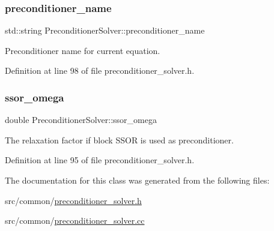 \mbox{\label{class_preconditioner_solver_a2d8afd11d073e87487da0442486c3e48}} 
\subsubsection{\texorpdfstring{preconditioner\+\_\+name}{preconditioner\_name}}
{\footnotesize\ttfamily std\+::string Preconditioner\+Solver\+::preconditioner\+\_\+name\hspace{0.3cm}{\ttfamily [private]}}



Preconditioner name for current equation. 



Definition at line 98 of file preconditioner\+\_\+solver.\+h.

\mbox{\label{class_preconditioner_solver_ab9548e7699e82a2b006db283c59e4a80}} 
\subsubsection{\texorpdfstring{ssor\+\_\+omega}{ssor\_omega}}
{\footnotesize\ttfamily double Preconditioner\+Solver\+::ssor\+\_\+omega\hspace{0.3cm}{\ttfamily [private]}}



The relaxation factor if block S\+S\+OR is used as preconditioner. 



Definition at line 95 of file preconditioner\+\_\+solver.\+h.



The documentation for this class was generated from the following files\+:\begin{DoxyCompactItemize}
\item 
src/common/\hyperlink{preconditioner__solver_8h}{preconditioner\+\_\+solver.\+h}\item 
src/common/\hyperlink{preconditioner__solver_8cc}{preconditioner\+\_\+solver.\+cc}\end{DoxyCompactItemize}
